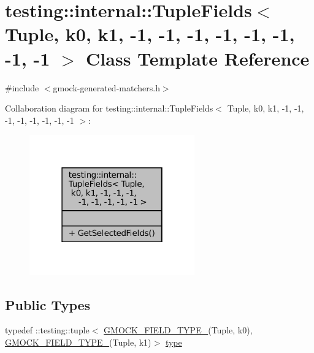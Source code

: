 \hypertarget{classtesting_1_1internal_1_1TupleFields_3_01Tuple_00_01k0_00_01k1_00_01-1_00_01-1_00_01-1_00_01-fb5812c507091ce72ac353453b83394d}{}\section{testing\+:\+:internal\+:\+:Tuple\+Fields$<$ Tuple, k0, k1, -\/1, -\/1, -\/1, -\/1, -\/1, -\/1, -\/1, -\/1 $>$ Class Template Reference}
\label{classtesting_1_1internal_1_1TupleFields_3_01Tuple_00_01k0_00_01k1_00_01-1_00_01-1_00_01-1_00_01-fb5812c507091ce72ac353453b83394d}


{\ttfamily \#include $<$gmock-\/generated-\/matchers.\+h$>$}



Collaboration diagram for testing\+:\+:internal\+:\+:Tuple\+Fields$<$ Tuple, k0, k1, -\/1, -\/1, -\/1, -\/1, -\/1, -\/1, -\/1, -\/1 $>$\+:
\nopagebreak
\begin{figure}[H]
\begin{center}
\leavevmode
\includegraphics[width=202pt]{classtesting_1_1internal_1_1TupleFields_3_01Tuple_00_01k0_00_01k1_00_01-1_00_01-1_00_01-1_00_01-f2ef9723437256d3375bd6320ba43a3e}
\end{center}
\end{figure}
\subsection*{Public Types}
\begin{DoxyCompactItemize}
\item 
typedef \+::testing\+::tuple$<$ \hyperlink{gmock-generated-matchers_8h_acf3e27de83a73f0d873da1cd471e505b}{G\+M\+O\+C\+K\+\_\+\+F\+I\+E\+L\+D\+\_\+\+T\+Y\+P\+E\+\_\+}(Tuple, k0), \hyperlink{gmock-generated-matchers_8h_acf3e27de83a73f0d873da1cd471e505b}{G\+M\+O\+C\+K\+\_\+\+F\+I\+E\+L\+D\+\_\+\+T\+Y\+P\+E\+\_\+}(Tuple, k1)$>$ \hyperlink{classtesting_1_1internal_1_1TupleFields_3_01Tuple_00_01k0_00_01k1_00_01-1_00_01-1_00_01-1_00_01-fb5812c507091ce72ac353453b83394d_ad0dd4e84d48ec9a5ef262cf32f6979f9}{type}
\end{DoxyCompactItemize}
